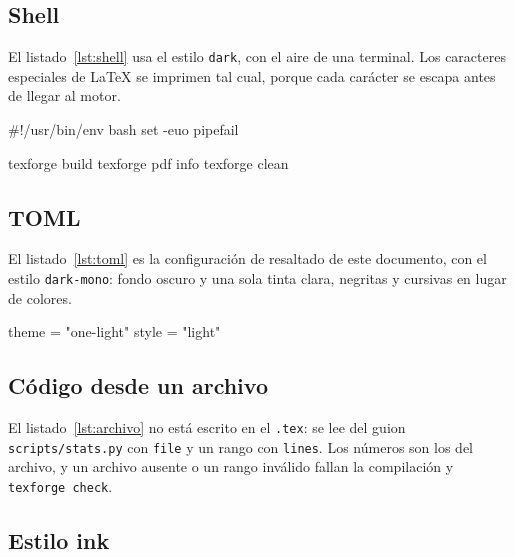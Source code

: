 \subsection{Shell}

El listado~\ref{lst:shell} usa el estilo \texttt{dark}, con el aire de una
terminal. Los caracteres especiales de \LaTeX{} se imprimen tal cual, porque
cada carácter se escapa antes de llegar al motor.

\begin{code}[lang=bash, style=dark, numbers=true, caption={Limpieza del directorio de compilación}, label={lst:shell}]
#!/usr/bin/env bash
set -euo pipefail

texforge build
texforge pdf info
texforge clean
\end{code}

\subsection{TOML}

El listado~\ref{lst:toml} es la configuración de resaltado de este
documento, con el estilo \texttt{dark-mono}: fondo oscuro y una sola tinta
clara, negritas y cursivas en lugar de colores.

\begin{code}[lang=toml, style=dark-mono, numbers=true, caption={Resaltado del propio documento}, label={lst:toml}]
[highlight]
theme = "one-light"
style = "light"
\end{code}

\subsection{Código desde un archivo}

El listado~\ref{lst:archivo} no está escrito en el \texttt{.tex}: se lee
del guion \texttt{scripts/stats.py} con \texttt{file} y un rango con
\texttt{lines}. Los números son los del archivo, y un archivo ausente o un
rango inválido fallan la compilación y \texttt{texforge check}.

\begin{code}[lang=python, file=scripts/stats.py, lines=5-24, numbers=true, caption={Funciones leídas del archivo}, label={lst:archivo}]
\end{code}

\subsection{Estilo ink}

